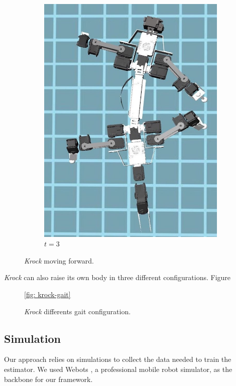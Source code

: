 \documentclass[../document.tex]{subfiles}
\begin{document}
\begin{figure}[H]
\begin{subfigure}[b]{0.3\textwidth}
			\includegraphics[width=\textwidth]{img/krock-moving-3}
			\caption{$t=3$}
	    \end{subfigure}	
	\label{fig: krock-moving}
	\caption{\emph{Krock} moving forward.}
	\end{figure}
\emph{Krock} can also raise its own body in three different configurations. Figure 


\begin{figure}
\ref{fig: krock-gait}
\caption{\emph{Krock} differents gait configuration.}	
\end{figure}
\subsection{Simulation}
Our approach relies on simulations to collect the data needed to train the estimator. We used Webots \cite{webots}, a professional mobile robot simulator, as the backbone for our framework. 
\end{document}
